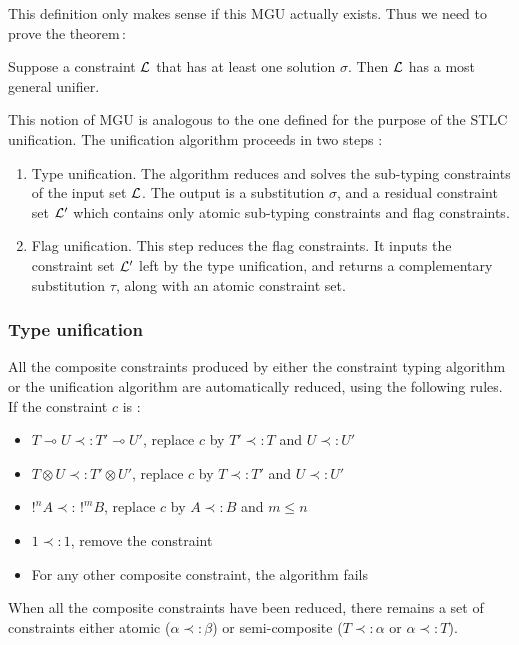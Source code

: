 This definition only makes sense if this MGU actually exists. Thus we need to prove the theorem\,:
\begin{thm}
	\label{existence-MGU}
	Suppose a constraint $\mathcal{L}$ that has at least one solution $\sigma$. Then $\mathcal{L}$ has a most general unifier.
\end{thm}

This notion of MGU is analogous to the one defined for the purpose of the STLC unification.
The unification algorithm proceeds in two steps :
	\begin{enumerate}
		\item Type unification. The algorithm reduces and solves the sub-typing constraints of the input set $\mathcal{L}$.
			The output is a substitution $\sigma$, and a residual constraint set $\mathcal{L}'$ which contains only atomic sub-typing constraints and
			flag constraints.
			
		\item Flag unification. This step reduces the flag constraints. It inputs the constraint set $\mathcal{L}'$ left by the type unification,
			and returns a complementary substitution $\tau$, along with an atomic constraint set.
	\end{enumerate}

\subsubsection{Type unification}

\begin{defn}
	All the composite constraints produced by either the constraint typing
  algorithm or the unification algorithm are automatically reduced, using the following rules.
  If the constraint $c$ is :
  	\begin{itemize}
      \item $T \multimap U \prec: T' \multimap U'$, replace $c$ by $T' \prec: T$ and $U \prec: U'$
      \item $T \otimes U \prec: T' \otimes U'$, replace $c$ by $T \prec: T'$ and $U \prec: U'$
      \item $!^n A \prec: \, !^m B$, replace $c$ by $A \prec: B$ and $m \le n$
      \item $1 \prec: 1$, remove the constraint
      \item For any other composite constraint, the algorithm fails
    \end{itemize}
  When all the composite constraints have been reduced, there remains a set of constraints either atomic ($\alpha \prec: \beta$) or
  semi-composite ($T \prec: \alpha$ or $\alpha \prec: T$).
\end{defn}

